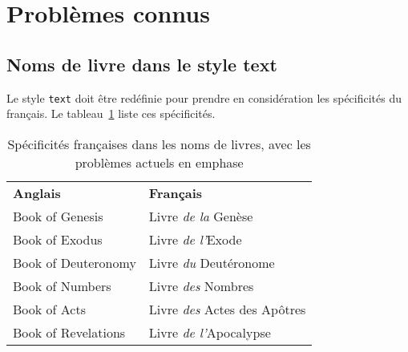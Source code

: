 \documentclass{ltxdoc}
\begin{document}
\section{Problèmes connus}

\subsection{Noms de livre dans le style  \textsf{text}}

Le style \verb|text| doit être redéfinie pour prendre en considération les spécificités du français. Le tableau~\ref{tab:textspec} liste ces spécificités.

\begin{table}[tbh]
\caption{Spécificités françaises dans les noms de livres, avec les problèmes actuels en emphase} 
\label{tab:textspec}
\vspace{10pt}
\begin{center}
\begin{tabular}{lp{}}
\bfseries Anglais & \bfseries Français\\
Book of Genesis & Livre \emph{de la} Gen\`ese\\
Book of Exodus & Livre \emph{de l'}Exode\\
Book of Deuteronomy & Livre \emph{du} Deut\'eronome\\
Book of Numbers & Livre \emph{des} Nombres\\
Book of Acts & Livre \emph{des} Actes des Ap\^otres\\
Book of Revelations & Livre \emph{de l'}Apocalypse\\
\end{tabular}
\end{center}
\end{table}
\end{document}
